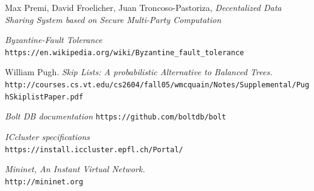 \documentclass{article}
\begin{document}
\begin{thebibliography}{9}
Max Premi, David Froelicher, Juan Troncoso-Pastoriza, \textit{Decentalized Data Sharing System based on Secure Multi-Party Computation}

\textit{Byzantine-Fault Tolerance}\\
\texttt{https://en.wikipedia.org/wiki/Byzantine\_fault\_tolerance}

William Pugh. \textit{Skip Lists: A probabilistic Alternative to Balanced Trees.}\\
\texttt{http://courses.cs.vt.edu/cs2604/fall05/wmcquain/Notes/Supplemental/PughSkiplistPaper.pdf}


\textit{Bolt DB documentation}
\texttt{https://github.com/boltdb/bolt}

\textit{ICcluster specifications}\\
\texttt{https://install.iccluster.epfl.ch/Portal/}

\textit{Mininet, An Instant Virtual Network.}\\
\texttt{http://mininet.org}
\end{thebibliography}
\end{document}

